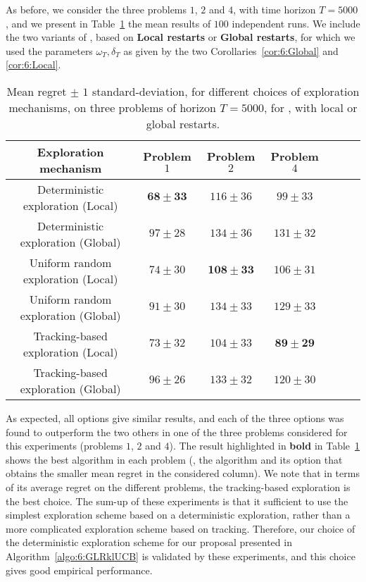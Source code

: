 As before, we consider the three problems $1$, $2$ and $4$, with time horizon $T=5000$,
and we present in Table~\ref{table:6:exploringDifferentForcedExplorationMechanisms} the mean results of $100$ independent runs.
We include the two variants of \GLRklUCB, based on \textbf{Local restarts} or \textbf{Global restarts}, for which we used the parameters $\omega_T,\delta_T$ as given by the two Corollaries~\ref{cor:6:Global} and \ref{cor:6:Local}.

\begin{table}[ht]
    \centering
    \begin{tabular}{c|cccccc}
        \textbf{Exploration mechanism} & Problem $1$ & Problem $2$ & Problem $4$ \\
        \hline
        Deterministic exploration (Local)   & $\mathbf{68 \pm 33}$ & $116 \pm 36$ & $99 \pm 33$ \\
        Deterministic exploration (Global)  & $97 \pm 28$ & $134 \pm 36$ & $131 \pm 32$ \\
        \hline
        Uniform random exploration (Local)  & $74 \pm 30$ & $\mathbf{108 \pm 33}$ & $106 \pm 31$ \\
        Uniform random exploration (Global) & $91 \pm 30$ & $134 \pm 33$ & $129 \pm 33$ \\
        \hline
        Tracking-based exploration (Local)  & $73 \pm 32$ & $104 \pm 33$ & $\mathbf{89 \pm 29}$ \\
        Tracking-based exploration (Global) & $96 \pm 26$ & $133 \pm 32$ & $120 \pm 30$
    \end{tabular}
    \caption{Mean regret $\pm$ $1$ standard-deviation, for different choices of exploration mechanisms, on three problems of horizon $T=5000$, for \GLRklUCB, with local or global restarts.}
    \label{table:6:exploringDifferentForcedExplorationMechanisms}
\end{table}

As expected, all options give similar results, and each of the three options was found to outperform the two others in one of the three problems considered for this experiments (problems $1$, $2$ and $4$).
The result highlighted in \textbf{bold} in Table~\ref{table:6:exploringDifferentForcedExplorationMechanisms} shows the best algorithm in each problem (\ie, the algorithm and its option that obtains the smaller mean regret in the considered column).
We note that in terms of its average regret on the different problems, the tracking-based exploration is the best choice.
%
The sum-up of these experiments is that it sufficient to use the simplest exploration scheme based on a deterministic exploration,
rather than a more complicated exploration scheme based on tracking.
Therefore, our choice of the deterministic exploration scheme for our proposal \GLRklUCB{} presented in Algorithm~\ref{algo:6:GLRklUCB} is validated by these experiments, and this choice gives good empirical performance.
